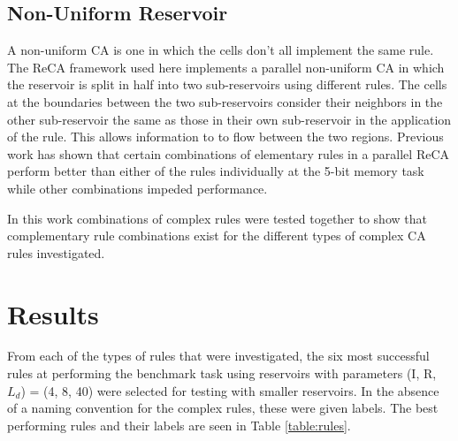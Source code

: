 \documentclass{article}
\begin{document}
\begin{multicols}{2}
\subsection{Non-Uniform Reservoir}
A non-uniform CA is one in which the cells don't all implement the same rule.  
The ReCA framework used here implements a parallel non-uniform CA in which the 
reservoir is split in half into two sub-reservoirs  using different rules.  The 
cells at the boundaries between  the two sub-reservoirs consider their 
neighbors in the other sub-reservoir the same as those in their own 
sub-reservoir in the application of the rule. This allows information to to 
flow between the two regions. Previous work has shown that certain combinations 
of elementary rules in a parallel ReCA perform better than either of the rules 
individually at the 5-bit memory task while other combinations impeded 
performance\cite{nichele2017reservoir}.  \par In this work combinations of 
complex rules were tested together to show that complementary rule combinations 
exist for the different types of complex CA rules investigated.  

\section{Results}\label{results}
From each of the types of rules that were investigated, the six most successful 
rules at performing the benchmark task using reservoirs with parameters (I, R, 
        $L_{d}$) = (4, 8, 40) were selected for testing with smaller  
reservoirs. In the absence of a naming convention for the complex rules, these 
were given labels. The best performing rules and their labels are seen in Table
\ref{table:rules}. \par


\end{multicols}
\end{document}

